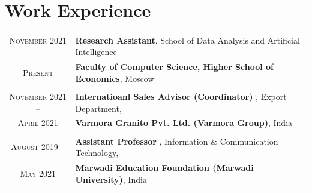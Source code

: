 \documentclass[a4paper,10pt]{article} %
\begin{document}

\section{Work Experience}
\begin{tabular}{cp{11.5cm}}	
	\textsc{November} 2021 --  & \textbf{Research Assistant}, School of Data Analysis and Artificial Intelligence \\
	\textsc{Present}& \textbf{Faculty of Computer Science, Higher School of Economics}, Moscow  \\
	\\
	\textsc{November} 2021 --  & \textbf{Internatioanl Sales Advisor (Coordinator)} , Export Department, \\
	\textsc{April} 2021 & \textbf{Varmora Granito Pvt. Ltd. (Varmora Group)}, India\\
	\\
	\textsc{August} 2019 --  & \textbf{Assistant Professor} , Information \& Communication Technology, \\
	\textsc{May} 2021 & \textbf{Marwadi Education Foundation (Marwadi University)}, India 
\end{tabular}

\end{document}
